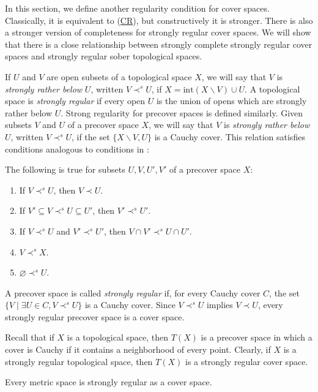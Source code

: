 \documentclass[reqno]{amsart}
\newcommand{\axref}[1]{(\hyperref[ax:#1]{#1})}
\theoremstyle{definition}
\theoremstyle{remark}
\numberwithin{figure}{section}
\newcommand{\rb}{\prec}
\begin{document}
In this section, we define another regularity condition for cover spaces.
Classically, it is equivalent to \axref{CR}, but constructively it is stronger.
There is also a stronger version of completeness for strongly regular cover spaces.
We will show that there is a close relationship between strongly complete strongly regular cover spaces and strongly regular sober topological spaces.

If $U$ and $V$ are open subsets of a topological space $X$, we will say that $V$ is \emph{strongly rather below} $U$, written $V \rb^s U$, if $X = \mathrm{int}(X \backslash V) \cup U$.
A topological space is \emph{strongly regular} if every open $U$ is the union of opens which are strongly rather below $U$.
Strong regularity for precover spaces is defined similarly.
Given subsets $V$ and $U$ of a precover space $X$, we will say that $V$ is \emph{strongly rather below} $U$, written $V \rb^s U$, if the set $\{ X \backslash V, U \}$ is a Cauchy cover.
This relation satisfies conditions analogous to conditions in :

\begin{prop}
The following is true for subsets $U,V,U',V'$ of a precover space $X$:
\begin{enumerate}
\item If $V \rb^s U$, then $V \rb U$.
\item If $V' \subseteq V \rb^s U \subseteq U'$, then $V' \rb^s U'$.
\item If $V \rb^s U$ and $V' \rb^s U'$, then $V \cap V' \rb^s U \cap U'$.
\item $V \rb^s X$.
\item $\varnothing \rb^s U$.
\end{enumerate}
\end{prop}

A precover space is called \emph{strongly regular} if, for every Cauchy cover $C$, the set $\{ V \mid \exists U \in C, V \rb^s U \}$ is a Cauchy cover.
Since $V \rb^s U$ implies $V \rb U$, every strongly regular precover space is a cover space.

\begin{example}
Recall that if $X$ is a topological space, then $T(X)$ is a precover space in which a cover is Cauchy if it contains a neighborhood of every point.
Clearly, if $X$ is a strongly regular topological space, then $T(X)$ is a strongly regular cover space.
\end{example}

\begin{example}
Every metric space is strongly regular as a cover space.
\end{example}
\end{document}

